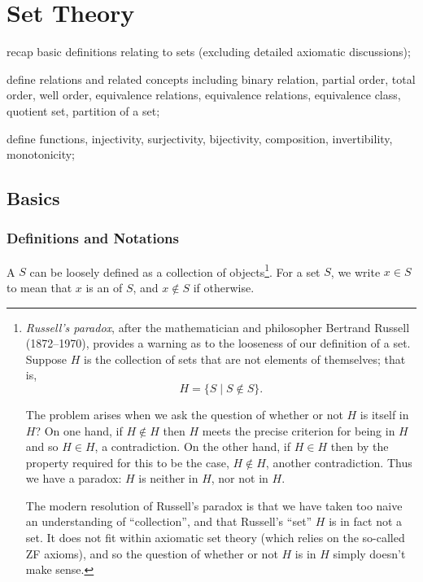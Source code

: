 \chapter{Set Theory}\label{chap:set-theory}

\begin{learn}
\item recap basic definitions relating to sets (excluding detailed axiomatic discussions);
\item define relations and related concepts including binary relation, partial order, total order, well order, equivalence relations, equivalence relations, equivalence class, quotient set, partition of a set;
\item define functions, injectivity, surjectivity, bijectivity, composition, invertibility, monotonicity;
\end{learn}

\section{Basics}
\subsection{Definitions and Notations}
A  $S$ can be loosely defined as a collection of objects\footnote{\emph{Russell's paradox}, after the mathematician and philosopher Bertrand Russell (1872--1970), provides a warning as to the looseness of our definition of a set. Suppose $H$ is the collection of sets that are not elements of themselves; that is,
\[H=\{S\mid S\notin S\}.\]

The problem arises when we ask the question of whether or not $H$ is itself in $H$? On one hand, if $H\notin H$ then $H$ meets the precise criterion for being in $H$ and so $H\in H$, a contradiction. On the other hand, if $H\in H$ then by the property required for this to be the case, $H\notin H$, another contradiction. Thus we have a paradox: $H$ is neither in $H$, nor not in $H$.

The modern resolution of Russell's paradox is that we have taken too naive an understanding of ``collection'', and that Russell's ``set'' $H$ is in fact not a set. It does not fit within axiomatic set theory (which relies on the so-called ZF axioms), and so the question of whether or not $H$ is in $H$ simply doesn't make sense.}. For a set $S$, we write $x \in S$ to mean that $x$ is an  of $S$, and $x \notin S$ if otherwise. 

